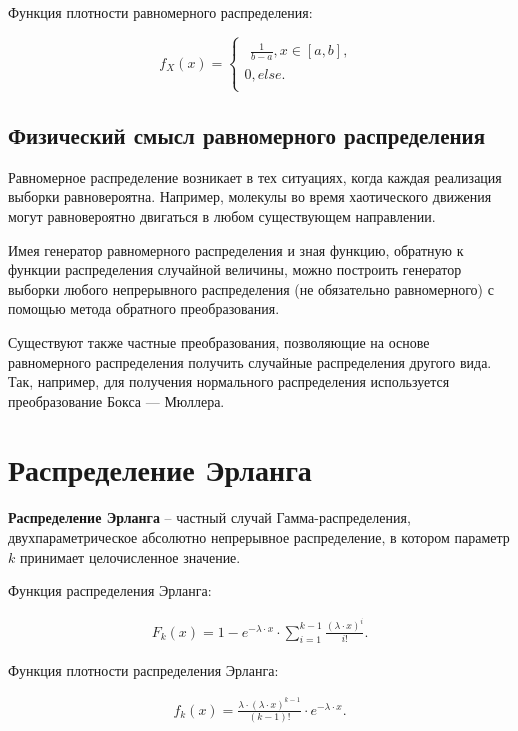 Функция плотности равномерного распределения:

\begin{equation}
    f_X(x) =
    \begin{cases}
            \begin{aligned}
                \frac{1}{b - a}, x \in [a, b], 
            \end{aligned}\\
            0, else. \\
    \end{cases}
\end{equation}
\subsection*{Физический смысл равномерного распределения}
Равномерное распределение возникает в тех ситуациях, когда каждая реализация выборки равновероятна.
Например, молекулы во время хаотического движения могут равновероятно двигаться в любом существующем направлении.

Имея генератор равномерного распределения и зная функцию, обратную к функции распределения случайной величины, можно построить генератор выборки любого непрерывного распределения (не обязательно равномерного) с помощью метода обратного преобразования.

Существуют также частные преобразования, позволяющие на основе равномерного распределения получить случайные распределения другого вида. Так, например, для получения нормального распределения используется преобразование Бокса — Мюллера.
\section{Распределение Эрланга}
\textbf{Распределение Эрланга} -- частный случай Гамма-распределения, двухпараметрическое абсолютно непрерывное распределение, в котором параметр $k$ принимает целочисленное значение.

Функция распределения Эрланга:

\begin{equation}
    \begin{aligned}
        F_k(x) = 1 - e^{-\lambda \cdot x} \cdot \sum_{i = 1}^{k - 1} \frac{(\lambda \cdot x)^i}{i!}.
    \end{aligned}
\end{equation}


Функция плотности распределения Эрланга:

\begin{equation}
    \begin{aligned}
        f_k(x) = \frac{\lambda \cdot (\lambda \cdot x)^{k - 1}}{(k - 1)!} \cdot e^{-\lambda \cdot x}.
    \end{aligned}
\end{equation}

